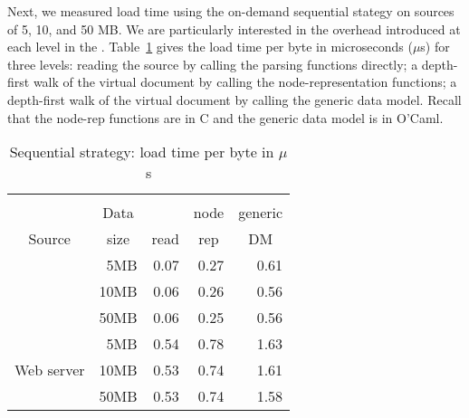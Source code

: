 

Next, we measured load time using the on-demand sequential stategy on
sources of 5, 10, and 50 MB.  We are particularly interested in the
overhead introduced at each level in the \condm{}.
Table~\ref{tab:linear} gives the load time per byte in microseconds
($\mu$s) for three levels: reading the source by calling the \pads{}
parsing functions directly; a depth-first walk of the virtual \Xml{}
document by calling the \padx{} node-representation functions; a
depth-first walk of the virtual \Xml{} document by calling the \padx{}
generic data model.  Recall that the node-rep functions are in C and
the generic data model is in O'Caml.
\begin{table}
\begin{center}
\begin{tabular}{c|r|r|r|r}
           &         &           &  \multicolumn{1}{c|}{\padx{}}   &  \multicolumn{1}{c}{\padx{}} \\
           & \multicolumn{1}{c|}{Data}  & \multicolumn{1}{c|}{\pads{}} & \multicolumn{1}{c|}{node}&  \multicolumn{1}{c}{generic} \\
Source     & \multicolumn{1}{c|}{size}  &  \multicolumn{1}{c|}{read}   & \multicolumn{1}{c|}{rep} &  \multicolumn{1}{c}{DM}  \\ \hline
           &  5MB  & 0.07    &  0.27  & 0.61 \\ %
\dibbler{} & 10MB  & 0.06    &  0.26  & 0.56 \\
           & 50MB  & 0.06    &  0.25  & 0.56 \\
           &  5MB  & 0.54    &  0.78  & 1.63 \\ %
Web server & 10MB  & 0.53    &  0.74  & 1.61 \\
           & 50MB  & 0.53    &  0.74  & 1.58 \\ \hline
\end{tabular}
\end{center}
\caption{Sequential strategy: load time per byte in $\mu$s}
\label{tab:linear}
\end{table}

